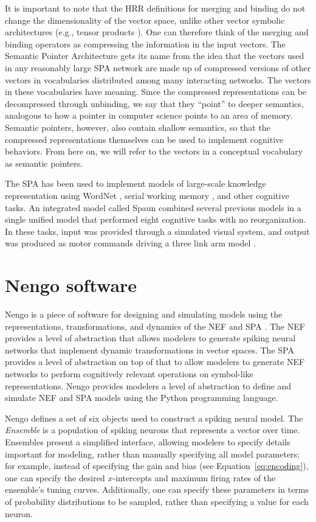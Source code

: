 It is important to note that
the HRR definitions for merging and binding
do not change the dimensionality
of the vector space,
unlike other vector symbolic architectures
(e.g., tensor products \citet{smolensky1990}).
One can therefore think of the
merging and binding operators
as compressing the information
in the input vectors.
The Semantic Pointer Architecture
gets its name from the idea that
the vectors used
in any reasonably large SPA network
are made up of compressed versions
of other vectors in vocabularies
distributed among many interacting networks.
The vectors in these vocabularies
have meaning.
Since the compressed representations
can be decompressed through unbinding,
we say that they ``point''
to deeper semantics,
analogous to how a pointer in computer science
points to an area of memory.
Semantic pointers, however,
also contain shallow semantics,
so that the compressed
representations themselves
can be used to implement cognitive behaviors.
From here on, we will refer to
the vectors in a conceptual vocabulary
as semantic pointers.

The SPA has been used to implement
models of large-scale knowledge representation
using WordNet \citep{crawford2014},
serial working memory \citep{choo2010},
and other cognitive tasks.
An integrated model called Spaun
combined several previous models
in a single unified model
that performed eight cognitive tasks
with no reorganization.
In these tasks, input was provided
through a simulated visual system,
and output was produced
as motor commands driving
a three link arm model
\citep{eliasmith2012,eliasmith2013}.

\section{Nengo software}
\label{sec:nengo}

Nengo is a piece of software
for designing and simulating
models using the representations,
transformations, and dynamics
of the NEF and SPA
\citep{bekolay2013}.
The NEF provides a level of abstraction
that allows modelers to generate
spiking neural networks
that implement dynamic transformations
in vector spaces.
The SPA provides a level of abstraction
on top of that
to allow modelers to generate
NEF networks to perform
cognitively relevant operations
on symbol-like representations.
Nengo provides modelers
a level of abstraction to
define and simulate NEF and SPA models
using the Python programming language.

Nengo defines a set of six objects
used to construct a spiking neural model.
The \textit{Ensemble} is
a population of spiking neurons
that represents a vector over time.
Ensembles present a simplified interface,
allowing modelers to specify
details important for modeling,
rather than manually specifying
all model parameters;
for example, instead of specifying
the gain and bias
(see Equation~\eqref{eq:encoding}),
one can specify the desired
$x$-intercepts and maximum firing rates
of the ensemble's tuning curves.
Additionally, one can specify
these parameters in terms of
probability distributions
to be sampled,
rather than specifying a value for each neuron.

